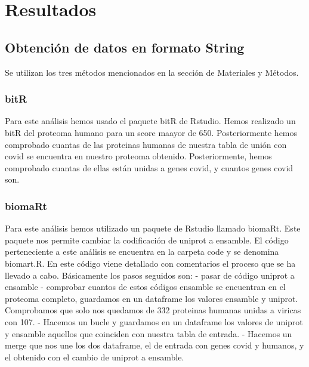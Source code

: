 
\section{Resultados}


\subsection{Obtención de datos en formato String}
Se utilizan los tres métodos mencionados en la sección de Materiales y Métodos.

\subsubsection{bitR}
Para este análisis hemos usado el paquete bitR de Rstudio. Hemos realizado un bitR del proteoma humano para un score maayor de 650. Posteriormente hemos comprobado cuantas de las proteinas humanas de nuestra tabla de unión con covid se encuentra en nuestro proteoma obtenido. Posteriormente, hemos comprobado cuantas de ellas están unidas a genes covid, y cuantos genes covid son.

\subsubsection{biomaRt}
Para este análisis hemos utilizado un paquete de Rstudio llamado biomaRt. Este paquete nos permite cambiar la codificación de uniprot a ensamble.
El código perteneciente a este análisis se encuentra en la carpeta code y se denomina biomart.R. En este código viene detallado con comentarios el
proceso que se ha llevado a cabo. Básicamente los pasos seguidos son: 
- pasar de código uniprot a ensamble
- comprobar cuantos de estos códigos ensamble se encuentran en el proteoma completo, guardamos en un dataframe los valores ensamble y uniprot.  Comprobamos que solo nos quedamos de 332 proteinas humanas unidas a viricas con 107.
- Hacemos un bucle y guardamos en un dataframe los valores de uniprot y ensamble aquellos que coinciden con nuestra tabla de entrada.
- Hacemos un merge que nos une los dos dataframe, el de entrada con genes covid y humanos, y el obtenido con el cambio de uniprot a ensamble. 


